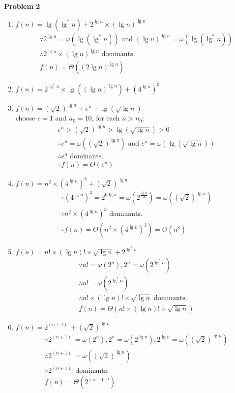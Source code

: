 \documentclass[12pt,letterpaper]{article}
\def\pp{\par\noindent}
\newcommand{\problem}[1]{ \bigskip \pp \textbf{Problem #1}\par}
\begin{document}
\problem{2}
\begin{enumerate}
\item $f(n)=\lg(\lg^*n)+2^{\lg n}\times(\lg n)^{\lg n}$
\begin{align*}
&\because 2^{\lg n}=\omega(\lg(\lg^*n)) \text{ and }(\lg n)^{\lg n}=\omega(\lg(\lg^*n))\\
&\therefore 2^{\lg n}\times(\lg n)^{\lg n}\text{ dominants.}\\
&f(n)=\Theta((2\lg n)^{\lg n})
\end{align*}
\item $f(n)=2^{\lg^*n}\times\lg((\lg n)^{\lg n})+(4^{\lg n})^3$
\item $f(n)=(\sqrt{2})^{\lg n}+e^n+\lg(\sqrt{\lg n})$\\
choose $c=1$ and $n_0=10$, for each $n>n_0$:
\begin{align*}
&e^n>(\sqrt{2})^{\lg n}>\lg(\sqrt{\lg n})>0\\
&\therefore e^n=\omega((\sqrt{2})^{\lg n}) \text{ and } e^n=\omega(\lg(\sqrt{\lg n}))\\
&\therefore e^n\text{ dominants.}\\
&\therefore f(n)=\Theta(e^n)
\end{align*}
\item $f(n)=n^2\times(4^{\lg n})^3+(\sqrt{2})^{\lg n}$
\begin{align*}
&\because (4^{\lg n})^3=2^{6\lg n}=\omega(2^{\frac{\lg n}{2}})=\omega((\sqrt{2})^{\lg n})\\
&\therefore n^2\times(4^{\lg n})^3\text{ dominants.}\\
&\therefore f(n)=\Theta(n^2\times(4^{\lg n})^3)=\Theta(n^8)
\end{align*}
\item $f(n)=n!\times(\lg n)!\times\sqrt{\lg n}+2^{\lg^*n}$
\begin{align*}
&\because n!=\omega(2^n),2^n=\omega(2^{\lg^*n})\\
&\therefore n!=\omega(2^{\lg^*n})\\
&\therefore n!\times(\lg n)!\times\sqrt{\lg n}\text{ dominants.}\\
&f(n)=\Theta(n!\times(\lg n)!\times\sqrt{\lg n})
\end{align*}
\item $f(n)=2^{(n+1)!}+(\sqrt{2})^{\lg n}$
\begin{align*}
&\because 2^{(n+1)!}=\omega(2^n), 2^n=\omega(2^{\lg n}),2^{\lg n}=\omega((\sqrt{2})^{\lg n})\\
&\therefore 2^{(n+1)!}=\omega((\sqrt{2})^{\lg n})\\
&\therefore 2^{(n+1)!}\text{ dominants.}\\
&f(n)=\Theta(2^{(n+1)!})
\end{align*}
\end{enumerate}
\end{document}
